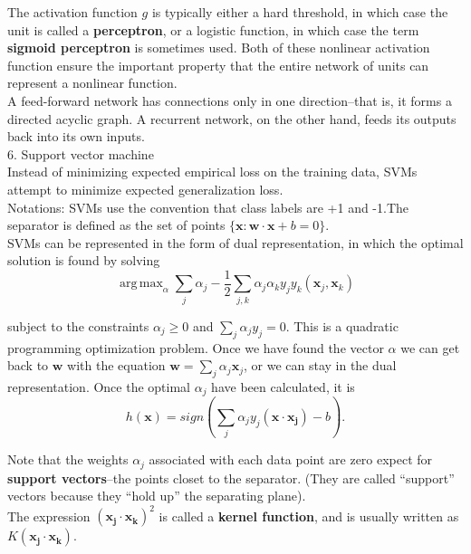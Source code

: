 \documentclass[12pt]{article}
\DeclareMathOperator*{\argmax}{arg\,max}
\begin{document}
The activation function $g$ is typically either a hard threshold, in which case the unit is called a {\bf perceptron}, or a logistic function, in which case the term {\bf sigmoid perceptron} is sometimes used. Both of these nonlinear activation function ensure the important property that the entire network of units can represent a nonlinear function. \\

A feed-forward network has connections only in one direction--that is, it forms a directed acyclic graph. A recurrent network, on the other hand, feeds its outputs back into its own inputs. \\

6. Support vector machine \\

Instead of minimizing expected empirical loss on the training data, SVMs attempt to minimize expected generalization loss. \\

Notations: SVMs use the convention that class labels are +1 and -1.The separator is defined as the set of points $\{\boldsymbol{x}: \boldsymbol{w} \cdot \boldsymbol{x} + b = 0 \}$. \\

SVMs can be represented in the form of dual representation, in which the optimal solution is found by solving
\begin{equation*}
  \argmax_{\alpha} \sum_j \alpha_j - \frac{1}{2} \sum_{j,k} \alpha_j \alpha_k y_j y_k (\boldsymbol{x}_j, \boldsymbol{x}_k)
\end{equation*}

subject to the constraints $\alpha_j \ge 0$ and $\sum_j \alpha_j y_j = 0$. This is a quadratic programming optimization problem. Once we have found the vector $\alpha$ we can get back to $\boldsymbol{w}$ with the equation $\boldsymbol{w} = \sum_j \alpha_j \boldsymbol{x}_j$, or we can stay in the dual representation. Once the optimal $\alpha_j$ have been calculated, it is
\begin{equation*}
  h(\boldsymbol{x})
  = sign \left( \sum_j \alpha_j y_j (\boldsymbol{x \cdot x_j}) - b \right).
\end{equation*}

Note that the weights $\alpha_j$ associated with each data point are zero expect for {\bf support vectors}--the points closet to the separator. (They are called ``support'' vectors because they ``hold up'' the separating plane). \\

The expression $(\boldsymbol{x_j \cdot x_k})^2$ is called a {\bf kernel function}, and is usually written as $K(\boldsymbol{x_j \cdot x_k})$.
\end{document}
